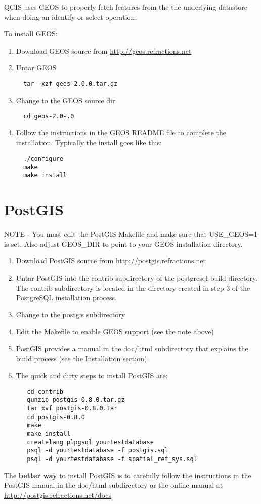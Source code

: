   QGIS uses GEOS to properly fetch features from the the underlying datastore
  when doing an identify or select operation.

  To install GEOS:
  \begin{enumerate}
  \item Download GEOS source from \url{http://geos.refractions.net}
  \item Untar GEOS
  \begin{verbatim}
  tar -xzf geos-2.0.0.tar.gz
  \end{verbatim}
  \item Change to the GEOS source dir
  \begin{verbatim}
  cd geos-2.0-.0
  \end{verbatim}
  \item Follow the instructions in the GEOS README file to complete the installation. Typically the install goes like this:
  \begin{verbatim}
  ./configure
  make
  make install
  \end{verbatim}

  \end{enumerate}

  \section{PostGIS}

  NOTE - You must edit the PostGIS Makefile and make sure that USE\_GEOS=1 is
  set. Also adjust GEOS\_DIR to point to your GEOS installation directory.
  \begin{enumerate}
  \item Download PostGIS source from \url{http://postgis.refractions.net} 

  \item Untar PostGIS into the contrib subdirectory of the postgresql build directory. The contrib subdirectory is located in the directory created in step 3 of the PostgreSQL installation process.
  \item Change to the postgis subdirectory
  \item Edit the Makefile to enable GEOS support (see the note above)
\item PostGIS provides a manual in the doc/html subdirectory that explains the build process (see the Installation section)
  \item The quick and dirty steps to install PostGIS are:
  \begin{verbatim}
   cd contrib
   gunzip postgis-0.8.0.tar.gz 
   tar xvf postgis-0.8.0.tar 
   cd postgis-0.8.0 
   make 
   make install 
   createlang plpgsql yourtestdatabase 
   psql -d yourtestdatabase -f postgis.sql 
   psql -d yourtestdatabase -f spatial_ref_sys.sql 
  \end{verbatim}
  \end{enumerate}
The \textbf{better way} to install PostGIS is to carefully follow the instructions in the PostGIS manual in the doc/html subdirectory or the online manual at \url{http://postgis.refractions.net/docs}

